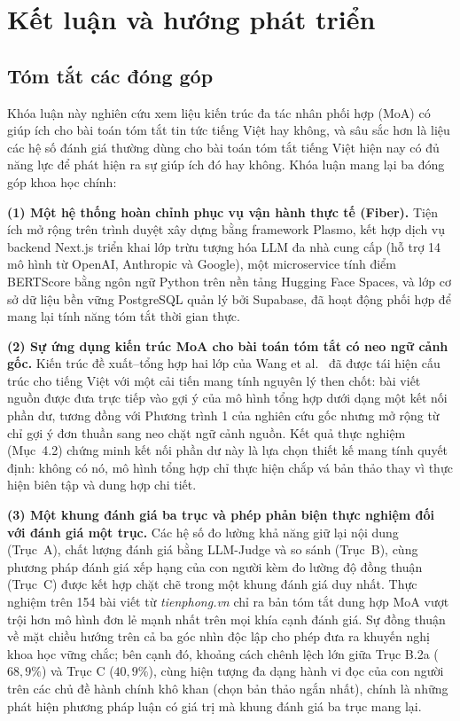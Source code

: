 \chapter{Kết luận và hướng phát triển}
\label{ch:conclusion}

\section{Tóm tắt các đóng góp}

Khóa luận này nghiên cứu xem liệu kiến trúc đa tác nhân phối hợp (MoA) có giúp ích cho bài toán tóm tắt tin tức tiếng Việt hay không, và sâu sắc hơn là liệu các hệ số đánh giá thường dùng cho bài toán tóm tắt tiếng Việt hiện nay có đủ năng lực để phát hiện ra sự giúp ích đó hay không. Khóa luận mang lại ba đóng góp khoa học chính: 

\textbf{(1) Một hệ thống hoàn chỉnh phục vụ vận hành thực tế (Fiber).} Tiện ích mở rộng trên trình duyệt xây dựng bằng framework Plasmo, kết hợp dịch vụ backend Next.js triển khai lớp trừu tượng hóa LLM đa nhà cung cấp (hỗ trợ 14 mô hình từ OpenAI, Anthropic và Google), một microservice tính điểm BERTScore bằng ngôn ngữ Python trên nền tảng Hugging Face Spaces, và lớp cơ sở dữ liệu bền vững PostgreSQL quản lý bởi Supabase, đã hoạt động phối hợp để mang lại tính năng tóm tắt thời gian thực.

\textbf{(2) Sự ứng dụng kiến trúc MoA cho bài toán tóm tắt có neo ngữ cảnh gốc.} Kiến trúc đề xuất--tổng hợp hai lớp của Wang et al.\ \cite{Wang2024} đã được tái hiện cấu trúc cho tiếng Việt với một cải tiến mang tính nguyên lý then chốt: bài viết nguồn được đưa trực tiếp vào gợi ý của mô hình tổng hợp dưới dạng một kết nối phần dư, tương đồng với Phương trình 1 của nghiên cứu gốc nhưng mở rộng từ chỉ gợi ý đơn thuần sang neo chặt ngữ cảnh nguồn. Kết quả thực nghiệm (Mục~4.2) chứng minh kết nối phần dư này là lựa chọn thiết kế mang tính quyết định: không có nó, mô hình tổng hợp chỉ thực hiện chắp vá bản thảo thay vì thực hiện biên tập và dung hợp chi tiết.

\textbf{(3) Một khung đánh giá ba trục và phép phản biện thực nghiệm đối với đánh giá một trục.} Các hệ số đo lường khả năng giữ lại nội dung (Trục~A), chất lượng đánh giá bằng LLM-Judge và so sánh (Trục~B), cùng phương pháp đánh giá xếp hạng của con người kèm đo lường độ đồng thuận (Trục~C) được kết hợp chặt chẽ trong một khung đánh giá duy nhất. Thực nghiệm trên 154 bài viết từ \textit{tienphong.vn} chỉ ra bản tóm tắt dung hợp MoA vượt trội hơn mô hình đơn lẻ mạnh nhất trên mọi khía cạnh đánh giá. Sự đồng thuận về mặt chiều hướng trên cả ba góc nhìn độc lập cho phép đưa ra khuyến nghị khoa học vững chắc; bên cạnh đó, khoảng cách chênh lệch lớn giữa Trục B.2a ($68,9\%$) và Trục C ($40,9\%$), cùng hiện tượng đa dạng hành vi đọc của con người trên các chủ đề hành chính khô khan (chọn bản thảo ngắn nhất), chính là những phát hiện phương pháp luận có giá trị mà khung đánh giá ba trục mang lại.

